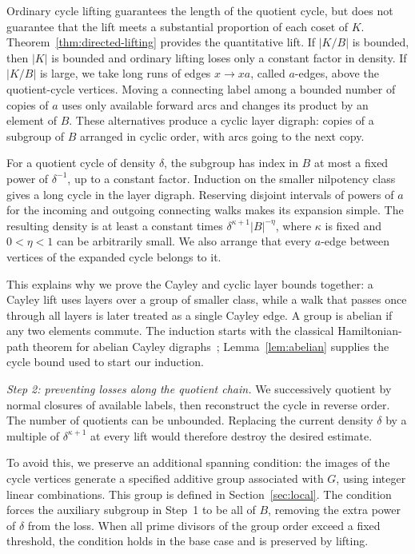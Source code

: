 \documentclass[11pt,a4paper,reqno]{amsart}
\theoremstyle{definition}
\theoremstyle{remark}
\numberwithin{equation}{section}
\begin{document}
Ordinary cycle lifting guarantees the length of the quotient cycle, but does not guarantee that the lift meets a substantial proportion of each coset of $K$. Theorem~\ref{thm:directed-lifting} provides the quantitative lift. If $|K/B|$ is bounded, then $|K|$ is bounded and ordinary lifting loses only a constant factor in density. If $|K/B|$ is large, we take long runs of edges $x\to xa$, called $a$-edges, above the quotient-cycle vertices. Moving a connecting label among a bounded number of copies of $a$ uses only available forward arcs and changes its product by an element of $B$. These alternatives produce a cyclic layer digraph: copies of a subgroup of $B$ arranged in cyclic order, with arcs going to the next copy.

For a quotient cycle of density $\delta$, the subgroup has index in $B$ at most a fixed power of $\delta^{-1}$, up to a constant factor. Induction on the smaller nilpotency class gives a long cycle in the layer digraph. Reserving disjoint intervals of powers of $a$ for the incoming and outgoing connecting walks makes its expansion simple. The resulting density is at least a constant times $\delta^{\kappa+1}|B|^{-\eta}$, where $\kappa$ is fixed and $0<\eta<1$ can be arbitrarily small. We also arrange that every $a$-edge between vertices of the expanded cycle belongs to it.

This explains why we prove the Cayley and cyclic layer bounds together: a Cayley lift uses layers over a group of smaller class, while a walk that passes once through all layers is later treated as a single Cayley edge. A group is abelian if any two elements commute. The induction starts with the classical Hamiltonian-path theorem for abelian Cayley digraphs~\cite[Lemma 2.1]{Morris}; Lemma~\ref{lem:abelian} supplies the cycle bound used to start our induction.

\smallskip
\noindent\emph{Step 2: preventing losses along the quotient chain.}
We successively quotient by normal closures of available labels, then reconstruct the cycle in reverse order. The number of quotients can be unbounded. Replacing the current density $\delta$ by a multiple of $\delta^{\kappa+1}$ at every lift would therefore destroy the desired estimate.

To avoid this, we preserve an additional spanning condition: the images of the cycle vertices generate a specified additive group associated with $G$, using integer linear combinations. This group is defined in Section~\ref{sec:local}. The condition forces the auxiliary subgroup in Step~1 to be all of $B$, removing the extra power of $\delta$ from the loss. When all prime divisors of the group order exceed a fixed threshold, the condition holds in the base case and is preserved by lifting.
\end{document}
